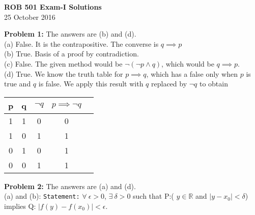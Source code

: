 \documentclass[letterpaper]{article}
\begin{document}
\newcommand{\trace}{\mathrm{trace}}
\newcommand{\real}{\mathbb R}  %
\newcommand{\nat}{\mathbb R}   %
\newcommand{\cp}{\mathbb C}    %
\newcommand{\ds}{\displaystyle}
\newcommand{\mf}[2]{\frac{\ds #1}{\ds #2}}
\newcommand{\book}[2]{{Luenberger, Page~#1, }{Prob.~#2}}
\newcommand{\spanof}[1]{\textrm{span} \{ #1 \}}
\parindent 0pt


\begin{center}
{\large \bf ROB 501 Exam-I Solutions}\\
25 October 2016
\end{center}

\vspace*{1cm}





\bigskip

\noindent \textbf{Problem 1:} The answers are (b) and (d). \\

(a) False. It is the contrapositive. The converse is $q \implies p$ \\

(b) True. Basis of a proof by contradiction. \\

(c) False. The given method would be  $ \neg (\neg p \land  q)$, which would be  $q \implies p$. \\

(d) True. We know the truth table for $p \implies q$, which has a false only when $p$ is true and $q$ is false. We apply this result with $q$ replaced by $\neg q$ to obtain

\begin{center}
\begin{tabular}{|c|c|c|c|c|}
\hline
p &q & $\neg q$ & $p \implies \neg q$ \\  \hline
1 & 1 & 0 & 0 \\
1 & 0& 1 & 1  \\
0 & 1 & 0& 1  \\
0 & 0 & 1 & 1  \\ \hline
\end{tabular}
\end{center}


\bigskip

\noindent \textbf{Problem 2:} The answers are (a) and (d). \\

(a) and (b): \texttt{Statement:}  $\forall ~\epsilon>0$,  $\exists~\delta>0$ such that P:( $y\in \real$ and $|y-x_0| < \delta$)  implies Q: $|f(y)-f(x_0)| < \epsilon$. \\
\end{document}
